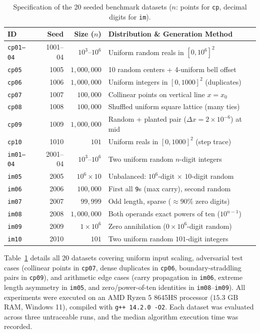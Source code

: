 \documentclass[10pt,twocolumn]{article}
\begin{document}
\begin{table}[t]
\centering
\caption{Specification of the 20 seeded benchmark datasets ($n$: points for \texttt{cp}, decimal digits for \texttt{im}).}
\label{tab:datasets}
\scriptsize
\setlength{\tabcolsep}{3.2pt}
\begin{tabularx}{\columnwidth}{@{}lrrX@{}}
\toprule
\textbf{ID} & \textbf{Seed} & \textbf{Size ($n$)} & \textbf{Distribution \& Generation Method} \\
\midrule
\texttt{cp01--04} & 1001--04 & $10^3$--$10^6$ & Uniform random reals in $[0, 10^6]^2$ \\
\texttt{cp05} & 1005 & $1{,}000{,}000$ & 10 random centers + 4-uniform bell offset \\
\texttt{cp06} & 1006 & $1{,}000{,}000$ & Uniform integers in $[0, 1000]^2$ (duplicates) \\
\texttt{cp07} & 1007 & $100{,}000$ & Collinear points on vertical line $x = x_0$ \\
\texttt{cp08} & 1008 & $100{,}000$ & Shuffled uniform square lattice (many ties) \\
\texttt{cp09} & 1009 & $1{,}000{,}000$ & Random + planted pair ($\Delta x = 2\times 10^{-6}$) at mid \\
\texttt{cp10} & 1010 & $101$ & Uniform reals in $[0, 1000]^2$ (step trace) \\
\midrule
\texttt{im01--04} & 2001--04 & $10^3$--$10^6$ & Two uniform random $n$-digit integers \\
\texttt{im05} & 2005 & $10^6 \times 10$ & Unbalanced: $10^6$-digit $\times$ $10$-digit random \\
\texttt{im06} & 2006 & $100{,}000$ & First all \texttt{9}s (max carry), second random \\
\texttt{im07} & 2007 & $99{,}999$ & Odd length, sparse ($\approx 90\%$ zero digits) \\
\texttt{im08} & 2008 & $1{,}000{,}000$ & Both operands exact powers of ten ($10^{n-1}$) \\
\texttt{im09} & 2009 & $1 \times 10^6$ & Zero annihilation ($0 \times 10^6$-digit random) \\
\texttt{im10} & 2010 & $101$ & Two uniform random $101$-digit integers \\
\bottomrule
\end{tabularx}
\vspace{-0.7em}
\end{table}

Table~\ref{tab:datasets} details all 20 datasets covering uniform input scaling, adversarial test cases (collinear points in \texttt{cp07}, dense duplicates in \texttt{cp06}, boundary-straddling pairs in \texttt{cp09}), and arithmetic edge cases (carry propagation in \texttt{im06}, extreme length asymmetry in \texttt{im05}, and zero/power-of-ten identities in \texttt{im08}--\texttt{im09}). All experiments were executed on an AMD Ryzen 5 8645HS processor ($15.3\text{ GB}$ RAM, Windows 11), compiled with \texttt{g++ 14.2.0 -O2}. Each dataset was evaluated across three untraceable runs, and the median algorithm execution time was recorded.\newline
\end{document}
